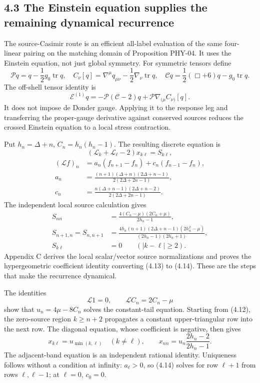 \hypertarget{the-einstein-equation-supplies-the-remaining-dynamical-recurrence}{%
\subsection{4.3 The Einstein equation supplies the remaining dynamical recurrence}\label{the-einstein-equation-supplies-the-remaining-dynamical-recurrence}}

The source-Casimir route is an efficient all-label evaluation of the same four-linear pairing on the matching domain of Proposition PHY-04. It uses the Einstein equation, not just global symmetry. For symmetric tensors define \[
\mathcal Pq=q-\frac12g_0\operatorname{tr}q,\quad
C_\nu[q]=\nabla^\mu q_{\mu\nu}-\frac12\nabla_\nu\operatorname{tr}q,\quad
\mathcal Cq=\frac12(\Box+6)q-g_0\operatorname{tr}q .
\] The off-shell tensor identity is \[
\mathcal E^{(1)}q
=-\mathcal P(\mathcal C-2)q
+\mathcal P\nabla_{(\mu}C_{\nu)}[q].
\tag{4.13}
\] It does not impose de Donder gauge. Applying it to the response leg and transferring the proper-gauge derivative against conserved sources reduces the crossed Einstein equation to a local stress contraction.

Put \(h_n=\Delta+n\), \(C_n=h_n(h_n-1)\). The resulting discrete equation is \[
(\mathcal L_k+\mathcal L_\ell-2)x_{k\ell}=S_{k\ell},
\tag{4.14}
\] \[
\begin{aligned}
(\mathcal Lf)_n&=a_n(f_{n+1}-f_n)+c_n(f_{n-1}-f_n),\\
a_n&=\frac{(n+1)(\Delta+n)(2\Delta+n-1)}
{2(2\Delta+2n-1)},\\
c_n&=\frac{n(\Delta+n-1)(2\Delta+n-2)}
{2(2\Delta+2n-1)} .
\end{aligned}
\tag{4.15}
\] The independent local source calculation gives \[
\begin{aligned}
S_{nn}&=\frac{4(C_n-\mu)(2C_n+\mu)}{2h_n-1},\\
S_{n+1,n}=S_{n,n+1}
&=\frac{4h_n(n+1)(2\Delta+n-1)(2h_n^2-\mu)}
{(2h_n-1)(2h_n+1)},\\
S_{k\ell}&=0\qquad(|k-\ell|\ge2).
\end{aligned}
\tag{4.16}
\] Appendix C derives the local scalar/vector source normalizations and proves the hypergeometric coefficient identity converting (4.13) to (4.14). These are the steps that make the recurrence dynamical.

The identities \[
\mathcal L1=0,\qquad \mathcal LC_n=2C_n-\mu
\tag{4.17}
\] show that \(u_n=4\mu-8C_n\) solves the constant-tail equation. Starting from (4.12), the zero-source region \(k\ge n+2\) propagates a constant upper-triangular row into the next row. The diagonal equation, whose coefficient is negative, then gives \[
x_{k\ell}=u_{\min(k,\ell)}\quad(k\ne\ell),\qquad
x_{nn}=u_n\frac{2h_n-2}{2h_n-1}.
\tag{4.18}
\] The adjacent-band equation is an independent rational identity. Uniqueness follows without a condition at infinity: \(a_\ell>0\), so (4.14) solves for row \(\ell+1\) from rows \(\ell,\ell-1\); at \(\ell=0\), \(c_0=0\).

